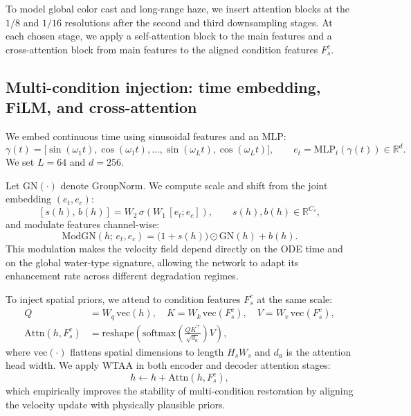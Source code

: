 \documentclass[runningheads]{llncs}
\begin{document}
To model global color cast and long-range haze, we insert attention blocks at the $1/8$ and $1/16$ resolutions after the second and third downsampling stages. At each chosen stage, we apply a self-attention block to the main features and a cross-attention block from main features to the aligned condition features $F^c_s$.

\subsection{Multi-condition injection: time embedding, FiLM, and cross-attention}
\label{sec:supp_inject}

We embed continuous time using sinusoidal features and an MLP:
\begin{equation}
\gamma(t)=\bigl[\sin(\omega_1 t),\cos(\omega_1 t),\dots,\sin(\omega_L t),\cos(\omega_L t)\bigr],
\qquad
e_t = \mathrm{MLP}_t\!\left(\gamma(t)\right)\in\mathbb{R}^{d}.
\label{eq:supp_time_emb}
\end{equation}
We set $L=64$ and $d=256$.

Let $\mathrm{GN}(\cdot)$ denote GroupNorm. We compute scale and shift from the joint embedding $(e_t,e_c)$:
\begin{equation}
\left[s(h),\,b(h)\right] = W_2\,\sigma\!\left(W_1\,[e_t;e_c]\right),
\qquad s(h),b(h)\in\mathbb{R}^{C_s},
\end{equation}
and modulate features channel-wise:
\begin{equation}
\mathrm{ModGN}(h;\,e_t,e_c) = \bigl(1+s(h)\bigr)\odot \mathrm{GN}(h) + b(h).
\label{eq:supp_modgn}
\end{equation}
This modulation makes the velocity field depend directly on the ODE time and on the global water-type signature, allowing the network to adapt its enhancement rate across different degradation regimes.

To inject spatial priors, we attend to condition features $F^c_s$ at the same scale:
\begin{align}
Q &= W_q\,\mathrm{vec}(h),\quad K=W_k\,\mathrm{vec}(F^c_s),\quad V=W_v\,\mathrm{vec}(F^c_s),\\
\mathrm{Attn}(h,F^c_s) &= \mathrm{reshape}\!\left(\mathrm{softmax}\!\left(\frac{QK^\top}{\sqrt{d_a}}\right)V\right),
\end{align}
where $\mathrm{vec}(\cdot)$ flattens spatial dimensions to length $H_sW_s$ and $d_a$ is the attention head width. We apply WTAA in both encoder and decoder attention stages:
\begin{equation}
h \leftarrow h + \mathrm{Attn}(h,F^c_s),
\label{eq:supp_cross_attn_res}
\end{equation}
which empirically improves the stability of multi-condition restoration by aligning the velocity update with physically plausible priors.
\end{document}
